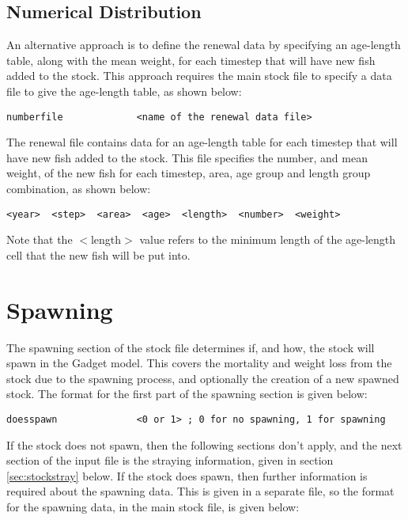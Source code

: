 \documentclass[]{book}
\begin{document}
\hypertarget{numerical-distribution-1}{%
\subsection{Numerical Distribution}\label{numerical-distribution-1}}

An alternative approach is to define the renewal data by specifying an
age-length table, along with the mean weight, for each timestep that
will have new fish added to the stock. This approach requires the main
stock file to specify a data file to give the age-length table, as shown
below:

\begin{verbatim}
numberfile             <name of the renewal data file>
\end{verbatim}

The renewal file contains data for an age-length table for each timestep
that will have new fish added to the stock. This file specifies the
number, and mean weight, of the new fish for each timestep, area, age
group and length group combination, as shown below:

\begin{verbatim}
<year>  <step>  <area>  <age>  <length>  <number>  <weight>
\end{verbatim}

Note that the \(<\)length\(>\) value refers to the minimum length of the
age-length cell that the new fish will be put into.

\hypertarget{sec:stockspawn}{%
\section{Spawning}\label{sec:stockspawn}}

The spawning section of the stock file determines if, and how, the stock
will spawn in the Gadget model. This covers the mortality and weight
loss from the stock due to the spawning process, and optionally the
creation of a new spawned stock. The format for the first part of the
spawning section is given below:

\begin{verbatim}
doesspawn              <0 or 1> ; 0 for no spawning, 1 for spawning
\end{verbatim}

If the stock does not spawn, then the following sections don't apply,
and the next section of the input file is the straying information,
given in section \ref{sec:stockstray} below. If the stock does spawn, then further
information is required about the spawning data. This is given in a
separate file, so the format for the spawning data, in the main stock
file, is given below:
\end{document}
